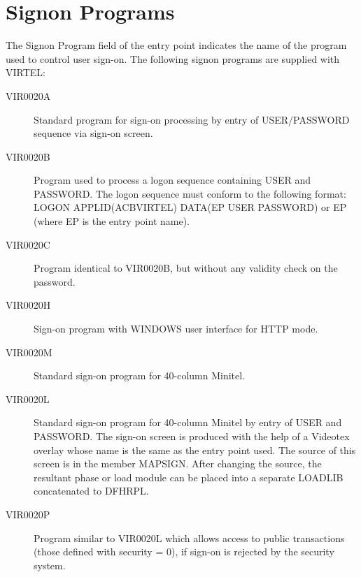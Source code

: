 \documentclass[letterpaper,10pt,english]{sphinxmanual}
\begin{document}
\section{Signon Programs}
\label{\detokenize{connectivity_guide:signon-programs}}
The Signon Program field of the entry point indicates the name of the program used to control user sign-on. The following signon programs are supplied with VIRTEL:
\begin{description}
\item[{VIR0020A}] \leavevmode
Standard program for sign-on processing by entry of USER/PASSWORD sequence via sign-on screen.

\item[{VIR0020B}] \leavevmode
Program used to process a logon sequence containing USER and PASSWORD. The logon sequence must conform to the following format: LOGON APPLID(ACBVIRTEL) DATA(EP USER PASSWORD) or EP (where EP is the entry point name).

\item[{VIR0020C}] \leavevmode
Program identical to VIR0020B, but without any validity check on the password.

\item[{VIR0020H}] \leavevmode
Sign-on program with WINDOWS user interface for HTTP mode.

\item[{VIR0020M}] \leavevmode
Standard sign-on program for 40-column Minitel.

\item[{VIR0020L}] \leavevmode
Standard sign-on program for 40-column Minitel by entry of USER and PASSWORD. The sign-on screen is produced with the help of a Videotex overlay whose name is the same as the entry point used. The source of this screen is in the member MAPSIGN. After changing the source, the resultant phase or load module can be placed into a separate LOADLIB concatenated to DFHRPL.

\item[{VIR0020P}] \leavevmode
Program similar to VIR0020L which allows access to public transactions (those defined with security = 0), if sign-on is rejected by the security system.

\end{description}
\end{document}
